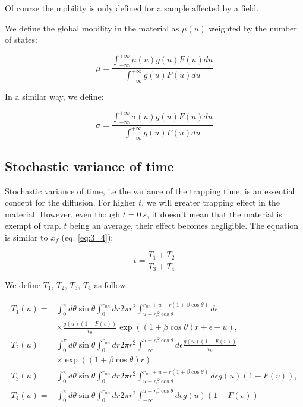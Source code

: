 Of course the mobility is only defined for a sample affected by a field.

We define the global mobility in the material as $\mu(u)$ weighted by the number of states:

\begin{equation}
    \mu = \frac{\int_{-\infty}^{+\infty}\mu(u)g(u)F(u)du}{\int_{-\infty}^{+\infty}g(u)F(u)du}
\end{equation}

In a similar way, we define:

\begin{equation}
    \sigma = \frac{\int_{-\infty}^{+\infty}\sigma(u)g(u)F(u)du}{\int_{-\infty}^{+\infty}g(u)F(u)du}
\end{equation}

\subsection{Stochastic variance of time}

Stochastic variance of time, i.e the variance of the trapping time, is an essential concept for the diffusion. For higher $t$, we will greater trapping effect in the material. However, even though $t = \SI{0}{s}$, it doesn't mean that the material is exempt of trap. $t$ being an average, their effect becomes negligible. The equation is similar to $x_f$ (eq. \ref{eq:3_4}):

\begin{equation}
    t = \frac{T_1 + T_2}{T_3 + T_4}
    \label{eq:t}
\end{equation}

We define $T_1$, $T_2$, $T_3$, $T_4$ as follow:

\begin{equation}
    \begin{aligned}
    T_{1}\left(u\right)=& \int_{0}^{\pi} d \theta \sin \theta \int_{0}^{r_{n n}} d r 2 \pi r^{2} \int_{u-r \beta \cos \theta}^{r_{n n}+u-r(1+\beta \cos \theta)} d \epsilon \\
    & \times \frac{g(u)(1 - F(v))}{v_{0}} \exp \left((1+\beta \cos \theta) r+\epsilon-u\right), \\
    T_{2}\left(u\right)=& \int_{0}^{\pi} d \theta \sin \theta \int_{0}^{r_{n n}} d r 2 \pi r^{2} \int_{-\infty}^{u-r \beta \cos \theta} d \epsilon \frac{g(u)(1 - F(v))}{v_{0}} \\
    & \times \exp ((1+\beta \cos \theta) r) \\
    T_{3}\left(u\right)=& \int_{0}^{\pi} d \theta \sin \theta \int_{0}^{r_{n n}} d r 2 \pi r^{2} \int_{u-r \beta \cos \theta}^{r_{n n}+u-r(1+\beta \cos \theta)} d \epsilon g(u)(1 - F(v)), \\
    T_{4}\left(u\right)=& \int_{0}^{\pi} d \theta \sin \theta \int_{0}^{r_{n n}} d r 2 \pi r^{2} \int_{-\infty}^{u-r \beta \cos \theta} d \epsilon g(u)(1 - F(v))
    \end{aligned}
\end{equation}

